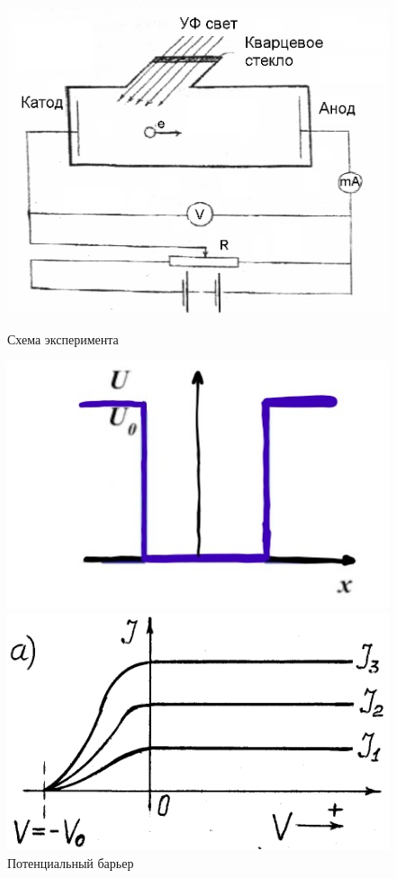 \begin{figure}[h]
\begin{center}
\begin{minipage}[h]{0.3\linewidth}
\includegraphics[width=1\linewidth]{pictures/2.png}
\caption{Схема эксперимента} %
\end{minipage}
\hfill
\begin{minipage}[h]{0.3\linewidth}
\includegraphics[width=1\linewidth]{pictures/2.1.jpg}
\caption{Потенциальный барьер}
\end{minipage}
\hfill
\begin{minipage}[h]{0.3\linewidth}
\includegraphics[width=1\linewidth]{pictures/2.2.png}

\end{minipage}
\end{center}
\end{figure}
